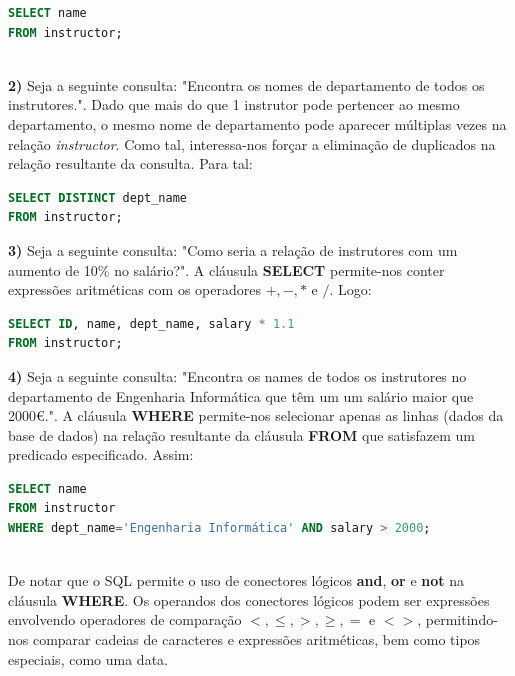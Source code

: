 \documentclass[oneside]{book}
\theoremstyle{definition}
\begin{document}
\begin{lstlisting}[language=SQL, morekeywords={REFERENCES, REFRESH, MATERIALIZED, CONCURRENTLY}, framesep=8pt, xleftmargin=40pt, framexleftmargin=40pt, frame=tb, framerule=0pt]
SELECT name
FROM instructor;
\end{lstlisting} \\
\textbf{2)} Seja a seguinte consulta: "Encontra os nomes de departamento de todos os instrutores.". Dado que mais do que 1 instrutor pode pertencer ao mesmo departamento, o mesmo nome de departamento pode aparecer múltiplas vezes na relação \textit{instructor}. Como tal, interessa-nos forçar a eliminação de duplicados na relação resultante da consulta. Para tal:

\begin{lstlisting}[language=SQL, morekeywords={REFERENCES, REFRESH, MATERIALIZED, CONCURRENTLY}, framesep=8pt, xleftmargin=40pt, framexleftmargin=40pt, frame=tb, framerule=0pt]
SELECT DISTINCT dept_name
FROM instructor;
\end{lstlisting}
\textbf{3)} Seja a seguinte consulta: "Como seria a relação de instrutores com um aumento de 10\% no salário?". A cláusula \textbf{SELECT} permite-nos conter expressões aritméticas com os operadores $+, -, *$ e $/$. Logo:

\begin{lstlisting}[language=SQL, morekeywords={REFERENCES, REFRESH, MATERIALIZED, CONCURRENTLY}, framesep=8pt, xleftmargin=40pt, framexleftmargin=40pt, frame=tb, framerule=0pt]
SELECT ID, name, dept_name, salary * 1.1
FROM instructor;
\end{lstlisting}
\textbf{4)} Seja a seguinte consulta: "Encontra os names de todos os instrutores no departamento de Engenharia Informática que têm um um salário maior que 2000€.". A cláusula \textbf{WHERE} permite-nos selecionar apenas as linhas (dados da base de dados) na relação resultante da cláusula \textbf{FROM} que satisfazem um predicado especificado. Assim:

\begin{lstlisting}[language=SQL, morekeywords={REFERENCES, REFRESH, MATERIALIZED, CONCURRENTLY}, framesep=8pt, xleftmargin=40pt, framexleftmargin=40pt, frame=tb, framerule=0pt]
SELECT name
FROM instructor
WHERE dept_name='Engenharia Informática' AND salary > 2000;
\end{lstlisting} \\
De notar que o SQL permite o uso de conectores lógicos \textbf{and}, \textbf{or} e \textbf{not} na cláusula \textbf{WHERE}. Os operandos dos conectores lógicos podem ser expressões envolvendo operadores de comparação $<, \leq, >, \geq, =$ e $<>$, permitindo-nos comparar cadeias de caracteres e expressões aritméticas, bem como tipos especiais, como uma data.
\end{document}
